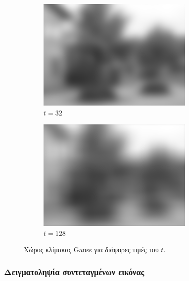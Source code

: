 \documentclass[a4paper,12pt]{article}
\begin{document}
\begin{figure}[H]
    \begin{subfigure}[b]{0.4\linewidth}
    \includegraphics[width=\linewidth]{Scalespace4.png}
    \caption{$t=32$}
    \end{subfigure}
    \begin{subfigure}[b]{0.4\linewidth}
    \includegraphics[width=\linewidth]{Scalespace5.png}
    \caption{$t=128$}
    \end{subfigure}

    \caption{Χώρος κλίμακας Gauss για διάφορες τιμές του $t$.}
    \label{fig:tGauss}
\end{figure}

\subsubsection{Δειγματοληψία συντεταγμένων εικόνας} \label{reg:sampling:1}
\end{document}
